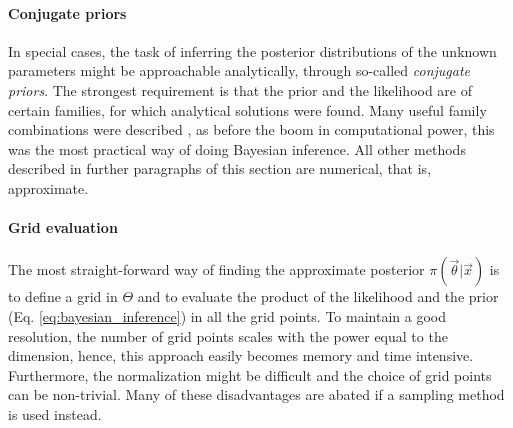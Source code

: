 \paragraph{Conjugate priors}
In special cases, the task of inferring the posterior distributions of the unknown parameters might be approachable analytically, through so-called \textit{conjugate priors}. The strongest requirement is that the prior and the likelihood are of certain families, for which analytical solutions were found. Many useful family combinations were described \cite{fink1997compendium}, as before the boom in computational power, this was the most practical way of doing Bayesian inference. All other methods described in further paragraphs of this section are numerical, that is, approximate.

\paragraph{Grid evaluation}
The most straight-forward way of finding the approximate posterior $\pi(\vec{\theta}|\vec{x})$ is to define a grid in $\Theta$ and to evaluate the product of the likelihood and the prior (Eq. \ref{eq:bayesian_inference}) in all the grid points. To maintain a good resolution, the number of grid points scales with the power equal to the dimension, hence, this approach easily becomes memory and time intensive. Furthermore, the normalization might be difficult and the choice of grid points can be non-trivial. Many of these disadvantages are abated if a sampling method is used instead. 

